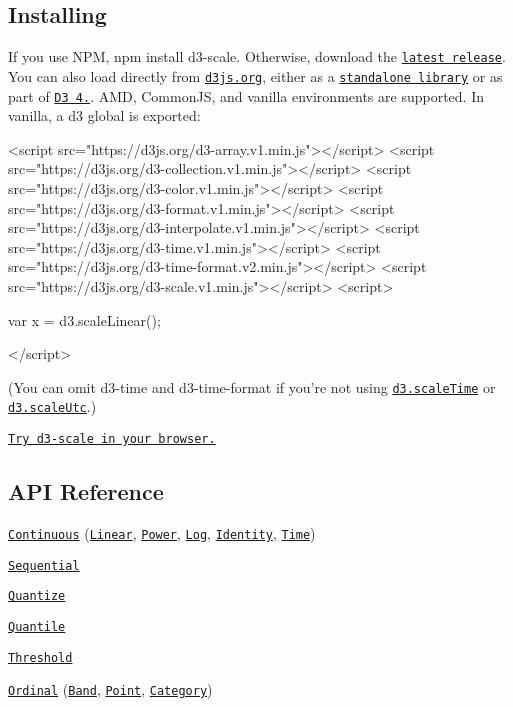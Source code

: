 \subsection*{Installing}

If you use N\+PM, {\ttfamily npm install d3-\/scale}. Otherwise, download the \href{https://github.com/d3/d3-scale/releases/latest}{\tt latest release}. You can also load directly from \href{https://d3js.org}{\tt d3js.\+org}, either as a \href{https://d3js.org/d3-scale.v1.min.js}{\tt standalone library} or as part of \href{https://github.com/d3/d3}{\tt D3 4.}. A\+MD, Common\+JS, and vanilla environments are supported. In vanilla, a {\ttfamily d3} global is exported\+:


\begin{DoxyCode}
<script src="https://d3js.org/d3-array.v1.min.js"></script>
<script src="https://d3js.org/d3-collection.v1.min.js"></script>
<script src="https://d3js.org/d3-color.v1.min.js"></script>
<script src="https://d3js.org/d3-format.v1.min.js"></script>
<script src="https://d3js.org/d3-interpolate.v1.min.js"></script>
<script src="https://d3js.org/d3-time.v1.min.js"></script>
<script src="https://d3js.org/d3-time-format.v2.min.js"></script>
<script src="https://d3js.org/d3-scale.v1.min.js"></script>
<script>

var x = d3.scaleLinear();

</script>
\end{DoxyCode}


(You can omit d3-\/time and d3-\/time-\/format if you’re not using \href{#scaleTime}{\tt d3.\+scale\+Time} or \href{#scaleUtc}{\tt d3.\+scale\+Utc}.)

\href{https://tonicdev.com/npm/d3-scale}{\tt Try d3-\/scale in your browser.}

\subsection*{A\+PI Reference}


\begin{DoxyItemize}
\item \href{#continuous-scales}{\tt Continuous} (\href{#linear-scales}{\tt Linear}, \href{#power-scales}{\tt Power}, \href{#log-scales}{\tt Log}, \href{#identity-scales}{\tt Identity}, \href{#time-scales}{\tt Time})
\item \href{#sequential-scales}{\tt Sequential}
\item \href{#quantize-scales}{\tt Quantize}
\item \href{#quantile-scales}{\tt Quantile}
\item \href{#threshold-scales}{\tt Threshold}
\item \href{#ordinal-scales}{\tt Ordinal} (\href{#band-scales}{\tt Band}, \href{#point-scales}{\tt Point}, \href{#category-scales}{\tt Category})
\end{DoxyItemize}

